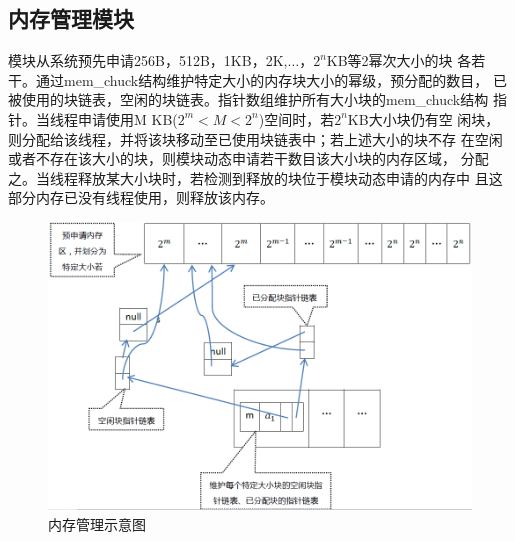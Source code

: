 
%
\subsection{内存管理模块}
		模块从系统预先申请256B，512B，1KB，2K,$\ldots$，$2^n$KB等2幂次大小的块
		各若干。通过mem\_chuck结构维护特定大小的内存块大小的幂级，预分配的数目，
		已被使用的块链表，空闲的块链表。指针数组维护所有大小块的mem\_chuck结构
		指针。当线程申请使用M KB($2^m < M < 2^n$)空间时，若$2^n$KB大小块仍有空
		闲块，则分配给该线程，并将该块移动至已使用块链表中；若上述大小的块不存
		在空闲或者不存在该大小的块，则模块动态申请若干数目该大小块的内存区域，
		分配之。当线程释放某大小块时，若检测到释放的块位于模块动态申请的内存中
		且这部分内存已没有线程使用，则释放该内存。
\begin{figure}[H]
\centering
\includegraphics[keepaspectratio,scale=0.5]{pitures/mm.png}
\caption{内存管理示意图}
\end{figure}

